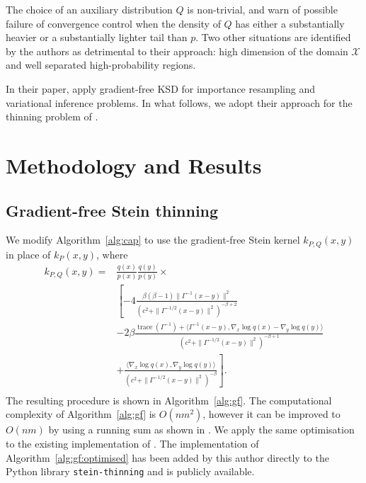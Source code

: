 \documentclass[11pt,a4paper]{report}
\DeclareMathOperator{\trace}{trace}
\begin{document}
The choice of an auxiliary distribution $Q$ is non-trivial, and \cite{fisherGradientFreeKernelStein2024} warn of possible failure of convergence control when the density of $Q$ has either a substantially heavier or a substantially lighter tail than $p$. Two other situations are identified by the authors as detrimental to their approach: high dimension of the domain $\mathcal{X}$ and well separated high-probability regions.

In their paper, \cite{fisherGradientFreeKernelStein2024} apply gradient-free KSD for importance resampling and variational inference problems. In what follows, we adopt their approach for the thinning problem of \cite{riabizOptimalThinningMCMC2022}.

\chapter{Methodology and Results}
\label{ch:methodology}

\section{Gradient-free Stein thinning}

We modify Algorithm~\ref{alg:cap} to use the gradient-free Stein kernel $k_{P,Q}(x,y)$ in place of $k_P(x, y)$, where
\begin{equation}
\begin{aligned}
k_{P,Q}(x, y)
= &\frac{q(x)}{p(x)} \frac{q(y)}{p(y)} \times \\
 &\left[ -4 \frac{\beta(\beta-1) \| \Gamma^{-1}(x - y)\|^2}{(c^2 + \| \Gamma^{-1/2}(x-y)\|^2)^{-\beta+2}} \right.  \\
&- 2 \beta \frac{\trace(\Gamma^{-1}) + \langle \Gamma^{-1} (x - y), \nabla_x \log q(x) - \nabla_y \log q(y)\rangle}{(c^2 + \| \Gamma^{-1/2}(x-y)\|^2)^{-\beta+1}} \\
& \left. + \frac{\langle \nabla_x \log q(x), \nabla_y \log q(y) \rangle}{(c^2 + \| \Gamma^{-1/2}(x-y)\|^2)^{-\beta}} \right]. \\
\label{eq:k_P_Q:expanded}
\end{aligned}
\end{equation}
The resulting procedure is shown in Algorithm~\ref{alg:gf}. The computational complexity of Algorithm~\ref{alg:gf} is $O(nm^2)$, however it can be improved to $O(nm)$ by using a running sum as shown in . We apply the same optimisation  to the existing implementation of . The implementation of Algorithm~\ref{alg:gf:optimised} has been added by this author directly to the Python library \texttt{stein-thinning} and is publicly available.
\end{document}
